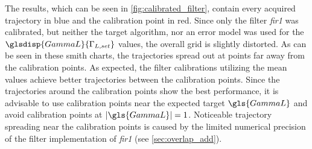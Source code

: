 \documentclass[12pt,a4paper,parskip=full,abstract=true,BCOR=12mm,twoside,open=right]{scrreprt}
\providecommand{\abs}[1]{\lvert#1\rvert}
\def\device#1{\mbox{\textit{#1}}}
\begin{document}
The results, which can be seen in \cref{fig:calibrated_filter}, contain every acquired
trajectory in blue and the calibration point in red. Since only the filter \device{fir1}
was calibrated, but neither the target algorithm, nor an error model was used for the
$\glsdisp{GammaL}{\Gamma_{L,set}}$ values, the overall grid is slightly distorted. As can be seen in these
smith charts, the trajectories spread out at points far away from the calibration points.
As expected, the filter calibrations utilizing the mean values achieve better trajectories
between the calibration points. Since the trajectories around the calibration points
show the best performance, it is advisable to use calibration points near the expected
target $\gls{GammaL}$ and avoid calibration points at $\abs{\gls{GammaL}} = 1$. Noticeable
trajectory spreading near the calibration points is caused by the limited numerical
precision of the filter implementation of \device{fir1} (see \cref{sec:overlap_add}).
\end{document}
